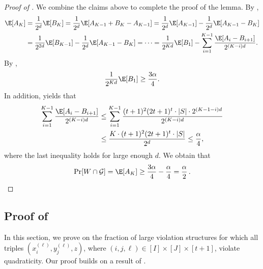 \documentclass[11pt]{article}
\numberwithin{equation}{section}
\theoremstyle{definition}
\theoremstyle{plain}
\begin{document}
\begin{proof}[Proof of ]
We combine the claims above to complete the proof of the lemma. By ,
\begin{align*}
    \E[A_{K}] &= \frac{1}{2^d}\E[B_{K}] = \frac{1}{2^d}\E[A_{K-1} + B_{K} - A_{K-1}] = \frac{1}{2^d}\E[A_{K-1}] - \frac{1}{2^d}\E[A_{K-1}-B_{K}] \\
    &= \frac{1}{2^{2d}}\E[B_{K-1}] - \frac{1}{2^d}\E[A_{K-1}-B_{K}] 
    = \dots = \frac{1}{2^{Kd}}\E[B_1] - \sum_{i=1}^{K-1} \frac{\E[A_i - B_{i+1}]}{2^{(K-i)d}}.
\end{align*}
By ,
\begin{equation*}
     \frac{1}{2^{Kd}}\E[B_1] \geq \frac{3\alpha}{4}. 
\end{equation*}
In addition,  yields that
\begin{align*}
    \sum_{i=1}^{K-1} \frac{\E[A_i - B_{i+1}]}{2^{(K-i)d}} &\leq  \sum_{i=1}^{K-1}\frac{(t+1)^2(2t+1)^t\cdot |S| \cdot 2^{(K-1-i)d}}{2^{(K-i)d}}\\ 
    &\leq \frac{K \cdot (t+1)^2(2t+1)^t\cdot |S|}{2^d} \leq \frac{\alpha}{4},
\end{align*}
where the last inequality holds for large enough $d$. We obtain that
%
%
\[
\Pr[W \cap \mathcal{G}] = \E[A_{K}] \geq \frac{3\alpha}{4} - \frac{\alpha}{4} = \frac{\alpha}{2}\,. \qedhere \]
\end{proof}



  
 

\subsection{Proof of } \label{sec:quadratic_witness}

In this section, we prove  on the fraction of large violation structures for which all triples $(x_i^{(\ell)}, y_{j}^{(\ell)}, z)$, where  $(i,j,\ell) \in [I]\times [J]\times [t+1]$, %
violate quadraticity. Our proof builds on a result of \cite{AlonKKLR05}.  
\end{document}
